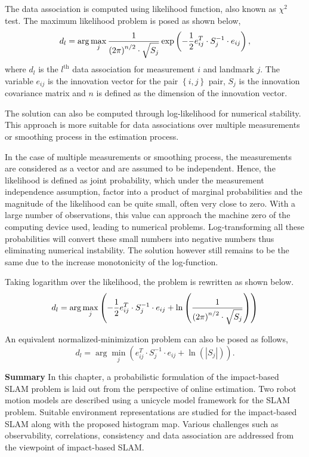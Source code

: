The data association is computed using likelihood function, also known as $\chi^2$ test. The maximum likelihood problem is posed as shown below,
\begin{equation}
d_l = \arg\max_{j}\frac{1}{\left(2\pi\right)^{n/2}\cdot\sqrt{\strut S_j}}\exp\left(-\frac{1}{2}e_{ij}^T\cdot S_j^{-1}\cdot e_{ij}\right),
\label{da_pfslam}
\end{equation}
where $d_l$ is the $l^{\text{th}}$ data association for measurement $i$ and landmark $j$. The variable $e_{ij}$ is the innovation vector for the pair $\left\lbrace i,j\right\rbrace$ pair, $S_j$ is the innovation covariance matrix and $n$ is defined as the dimension of the innovation vector.

\begin{rem}
The solution can also be computed through log-likelihood for numerical stability. This approach is more suitable for data associations over multiple measurements or smoothing process in the estimation process.
\end{rem}

In the case of multiple measurements or smoothing process, the measurements are considered as a vector and are assumed to be independent. Hence, the likelihood is defined as joint probability, which under the measurement independence assumption, factor into a product of marginal probabilities and the magnitude of the likelihood can be quite small, often very close to zero. With a large number of observations, this value can approach the machine zero of the computing device used, leading to numerical problems. Log-transforming all these probabilities will convert these small numbers into negative numbers thus eliminating numerical instability. The solution however still remains to be the same due to the increase monotonicity of the log-function.

Taking logarithm over the likelihood, the problem is rewritten as shown below.
\begin{equation}
d_l = \arg\max_{j}\left(-\frac{1}{2}e_{ij}^T\cdot S_j^{-1}\cdot e_{ij}+\ln\left(\frac{1}{\left(2\pi\right)^{n/2}\cdot\sqrt{\strut S_j}}\right)\right)
\end{equation}

An equivalent normalized-minimization problem can also be posed as follows,
\begin{equation}
d_l = \arg\min_{j}\left(e_{ij}^T\cdot S_j^{-1}\cdot e_{ij}+\ln(|S_j|)\right).
\end{equation}

\textbf{Summary} 
In this chapter, a probabilistic formulation of the impact-based SLAM problem is laid out from the perspective of online estimation. Two robot motion models are described using a unicycle model framework for the SLAM problem. Suitable environment representations are studied for the impact-based SLAM along with the proposed histogram map. Various challenges such as observability, correlations, consistency and data association are addressed from the viewpoint of impact-based SLAM.